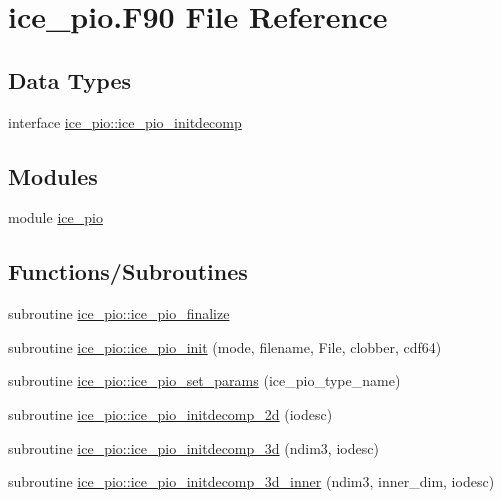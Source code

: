 \hypertarget{ice__pio_8F90}{
\section{ice\_\-pio.F90 File Reference}
\label{ice__pio_8F90}
}
\subsection*{Data Types}
\begin{DoxyCompactItemize}
\item 
interface \hyperlink{interfaceice__pio_1_1ice__pio__initdecomp}{ice\_\-pio::ice\_\-pio\_\-initdecomp}
\end{DoxyCompactItemize}
\subsection*{Modules}
\begin{DoxyCompactItemize}
\item 
module \hyperlink{namespaceice__pio}{ice\_\-pio}
\end{DoxyCompactItemize}
\subsection*{Functions/Subroutines}
\begin{DoxyCompactItemize}
\item 
subroutine \hyperlink{namespaceice__pio_a82e41ef2d2fdafcbd23064613f27c5f1}{ice\_\-pio::ice\_\-pio\_\-finalize}
\item 
subroutine \hyperlink{namespaceice__pio_a14b08b2f773c9970e0938770ad4746e2}{ice\_\-pio::ice\_\-pio\_\-init} (mode, filename, File, clobber, cdf64)
\item 
subroutine \hyperlink{namespaceice__pio_a109c38fa2166ac88371fb66b04aa16a5}{ice\_\-pio::ice\_\-pio\_\-set\_\-params} (ice\_\-pio\_\-type\_\-name)
\item 
subroutine \hyperlink{namespaceice__pio_abd0ade136046f0940881df9f9d8c85f3}{ice\_\-pio::ice\_\-pio\_\-initdecomp\_\-2d} (iodesc)
\item 
subroutine \hyperlink{namespaceice__pio_ad58ca6d958a4735d1709586ad6fde92c}{ice\_\-pio::ice\_\-pio\_\-initdecomp\_\-3d} (ndim3, iodesc)
\item 
subroutine \hyperlink{namespaceice__pio_affe281885b53719d3c30c772637990db}{ice\_\-pio::ice\_\-pio\_\-initdecomp\_\-3d\_\-inner} (ndim3, inner\_\-dim, iodesc)
\end{DoxyCompactItemize}
